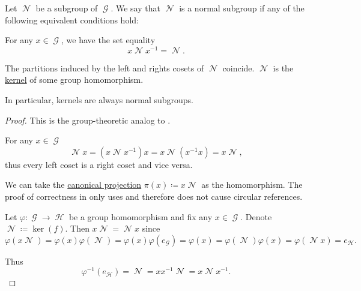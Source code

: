 \begin{definition}\label{def:normal_subgroup}
  Let \( \mscrN \) be a subgroup of \( \mscrG \). We say that \( \mscrN \) is a normal subgroup if any of the following equivalent conditions hold:
  \begin{thmenum}
     For any \( x \in \mscrG \), we have the set equality
    \begin{equation}\label{eq:def:normal_subgroup/direct}
      x \mscrN x^{-1} = \mscrN.
    \end{equation}

     The partitions induced by the left and rights cosets of \( \mscrN \) coincide.
     \( \mscrN \) is the \hyperref[def:unital_magma_kernel]{kernel} of some group homomorphism.
  \end{thmenum}

  In particular, kernels are always normal subgroups.
\end{definition}
\begin{proof}
  This is the group-theoretic analog to .

   For any \( x \in \mscrG \)
  \begin{equation*}
    \mscrN x = (x \mscrN x^{-1})x = x \mscrN(x^{-1}x) = x \mscrN,
  \end{equation*}
  thus every left coset is a right coset and vice versa.

   We can take the \hyperref[def:quotient_group]{canonical projection} \( \pi(x) \coloneqq x \mscrN \) as the homomorphism. The proof of correctness in  only uses  and therefore does not cause circular references.

   Let \( \varphi: \mscrG \to \mscrH \) be a group homomorphism and fix any \( x \in \mscrG \). Denote \( \mscrN \coloneqq \ker(f) \). Then \( x \mscrN = \mscrN x \) since
  \begin{equation*}
    \varphi(x \mscrN)
    =
    \varphi(x) \varphi(\mscrN)
    =
    \varphi(x) \varphi(e_{\mscrG})
    =
    \varphi(x)
    =
    \varphi(\mscrN) \varphi(x)
    =
    \varphi(\mscrN x)
    =
    e_{\mscrH}.
  \end{equation*}

  Thus
  \begin{equation*}
    \varphi^{-1}(e_{\mscrH}) = \mscrN = xx^{-1}\mscrN = x \mscrN x^{-1}.
  \end{equation*}
\end{proof}

